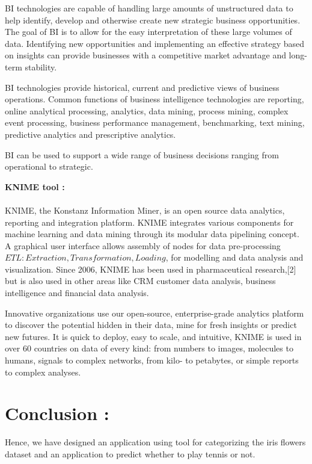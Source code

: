 \documentclass[a4paper,12pt]{article}
\begin{document}
BI technologies are capable of handling large amounts of unstructured data to help identify, develop and otherwise create new strategic business opportunities. The goal of BI is to allow for the easy interpretation of these large volumes of data. Identifying new opportunities and implementing an effective strategy based on insights can provide businesses with a competitive market advantage and long-term stability. 

BI technologies provide historical, current and predictive views of business operations. Common functions of business intelligence technologies are  reporting, online analytical processing, analytics, data mining, process mining, complex event processing, business performance management, benchmarking, text mining, predictive analytics and prescriptive analytics.

BI can be used to support a wide range of business decisions ranging from operational to strategic.


\textbf{KNIME tool :}\\
\\
KNIME, the Konstanz Information Miner, is an open source data analytics, reporting and integration platform. KNIME integrates various components for machine learning and data mining through its modular data pipelining concept. A graphical user interface allows assembly of nodes for data pre-processing \(ETL: Extraction, Transformation, Loading\), for modelling and data analysis and visualization.
Since 2006, KNIME has been used in pharmaceutical research,[2] but is also used in other areas like CRM customer data analysis, business intelligence and financial data analysis.


Innovative organizations use our open-source, enterprise-grade analytics platform to discover the potential hidden in their data, mine for fresh insights or predict new futures. It is quick to deploy, easy to scale, and intuitive, KNIME is used in over 60 countries on data of every kind: from numbers to images, molecules to humans, signals to complex networks, from kilo- to petabytes, or simple reports to complex analyses.

\section{Conclusion : }

Hence, we have designed an application using tool for categorizing the iris flowers dataset and an application to predict whether to play tennis or not.
\end{document}
